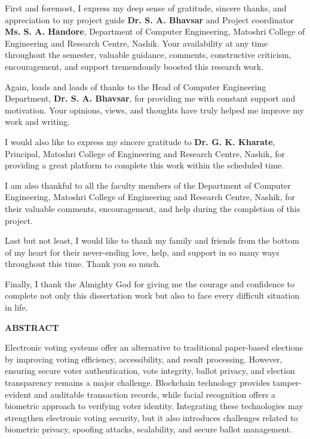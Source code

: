 \documentclass[12pt]{report}
\begin{document}
	\doublespacing
	
	First and foremost, I express my deep sense of gratitude, sincere thanks, and appreciation to my project guide \textbf{Dr. S. A. Bhavsar} and Project coordinator \textbf{Ms. S. A. Handore}, Department of Computer Engineering, Matoshri College of Engineering and Research Centre, Nashik. Your availability at any time throughout the semester, valuable guidance, comments, constructive criticism, encouragement, and support tremendously boosted this research work.
	
	Again, loads and loads of thanks to the Head of Computer Engineering Department, \textbf{Dr. S. A. Bhavsar}, for providing me with constant support and motivation. Your opinions, views, and thoughts have truly helped me improve my work and writing.
	
	I would also like to express my sincere gratitude to \textbf{Dr. G. K. Kharate}, Principal, Matoshri College of Engineering and Research Centre, Nashik, for providing a great platform to complete this work within the scheduled time.
	
	I am also thankful to all the faculty members of the Department of Computer Engineering, Matoshri College of Engineering and Research Centre, Nashik, for their valuable comments, encouragement, and help during the completion of this project.
	
	Last but not least, I would like to thank my family and friends from the bottom of my heart for their never-ending love, help, and support in so many ways throughout this time. Thank you so much.
	
	Finally, I thank the Almighty God for giving me the courage and confidence to complete not only this dissertation work but also to face every difficult situation in life.
	
	\newpage
	
	\begin{center}
		{\Large \textbf{ABSTRACT}}
	\end{center}
	
	\doublespacing
	
	Electronic voting systems offer an alternative to traditional paper-based elections by improving voting efficiency, accessibility, and result processing. However, ensuring secure voter authentication, vote integrity, ballot privacy, and election transparency remains a major challenge. Blockchain technology provides tamper-evident and auditable transaction records, while facial recognition offers a biometric approach to verifying voter identity. Integrating these technologies may strengthen electronic voting security, but it also introduces challenges related to biometric privacy, spoofing attacks, scalability, and secure ballot management.
	
\end{document}

